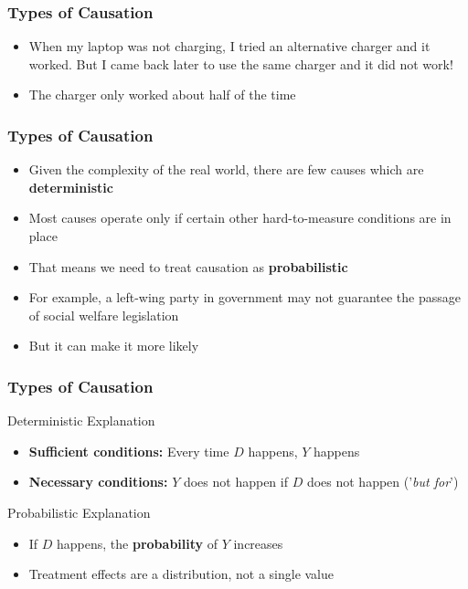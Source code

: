 \documentclass[xcolor=x11names,compress]{beamer}\usepackage[]{graphicx}\usepackage[]{color}
\renewcommand{\(}{\begin{columns}}
\renewcommand{\)}{\end{columns}}
\newcommand{\<}[1]{\begin{column}{#1}}
\renewcommand{\>}{\end{column}}
\begin{document}
\begin{frame}
\frametitle{Types of Causation}
\begin{itemize}
\item When my laptop was not charging, I tried an alternative charger and it worked. But I came back later to use the same charger and it did not work! 
\pause
\item The charger only worked about half of the time
\end{itemize}
\end{frame}

\begin{frame}
\frametitle{Types of Causation}
\begin{itemize}
\item Given the complexity of the real world, there are few causes which are \textbf{deterministic}
\pause
\item Most causes operate only if certain other hard-to-measure conditions are in place
\pause
\item That means we need to treat causation as \textbf{probabilistic}
\pause
\item For example, a left-wing party in government may not guarantee the passage of social welfare legislation
\item But it can make it more likely
\end{itemize}
\end{frame}

\begin{frame}
\frametitle{Types of Causation}
\begin{multicols}{2}
\textcolor{dkblue}{Deterministic Explanation}
\pause
\begin{itemize}
\item \textbf{Sufficient conditions:} Every time $D$ happens, $Y$ happens
\pause
\item \textbf{Necessary conditions:} $Y$ does not happen if $D$ does not happen ('\textit{but for}')
\end{itemize}
\pause
\columnbreak
\textcolor{dkblue}{Probabilistic Explanation}
\pause
\begin{itemize}
\item If $D$ happens, the \textbf{probability} of $Y$ increases
\pause
\item Treatment effects are a distribution, not a single value
\end{itemize}
\end{multicols}
\end{frame}
\end{document}
